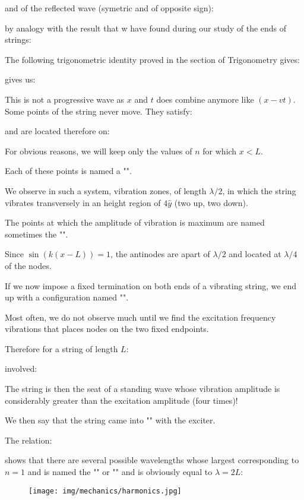	and of the reflected wave (symetric and of opposite sign):
	
	by analogy with the result that w have found during our study of the ends of strings:
	
	The following trigonometric identity proved in the section of Trigonometry gives:
	
	gives us:
	
	This is not a progressive wave as $x$ and $t$ does combine anymore like $(x-vt)$. Some points of the string never move. They satisfy:
	
	and are located therefore on:
	
	For obvious reasons, we will keep only the values of $n$ for which $x<L$.
	
	Each of these points is named a "".
	
	We observe in such a system, vibration zones, of length $\lambda/2$, in which the string vibrates transversely in an height region of $4\hat{y}$ (two up, two down).
	\begin{tcolorbox}[title=Remark,colframe=black,arc=10pt]
	The points at which the amplitude of vibration is maximum are named sometimes the "".
	\end{tcolorbox}
	Since $\sin(k(x-L))=1$, the antinodes are apart of $\lambda/2$ and located at $\lambda/4$ of the nodes.
	
	If we now impose a fixed termination on both ends of a vibrating string, we end up with a configuration named "".
	
	Most often, we do not observe much until we find the excitation frequency vibrations that places nodes on the two fixed endpoints.
	
	Therefore for a string of length $L$:
	
	involved:
	
	The string is then the seat of a standing wave whose vibration amplitude is considerably greater than the excitation amplitude (four times)!
	
	We then say that the string came into "" with the exciter.
	
	The relation:
	
	shows that there are several possible wavelengths whose largest corresponding to $n = 1$ and is named the "" or "" and is obviously equal to $\lambda=2L$:
	\begin{figure}[H]
		\centering
		\texttt{[image: img/mechanics/harmonics.jpg]}
	\end{figure}
	
